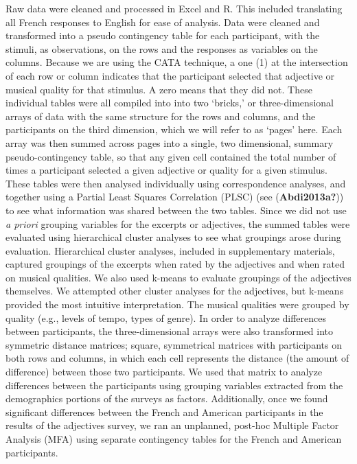 \documentclass[
  english,
  man,floatsintext]{apa6}
\begin{document}
Raw data were cleaned and processed in Excel and R. This included translating all French responses to English for ease of analysis. Data were cleaned and transformed into a pseudo contingency table for each participant, with the stimuli, as observations, on the rows and the responses as variables on the columns. Because we are using the CATA technique, a one (1) at the intersection of each row or column indicates that the participant selected that adjective or musical quality for that stimulus. A zero means that they did not. These individual tables were all compiled into into two `bricks,' or three-dimensional arrays of data with the same structure for the rows and columns, and the participants on the third dimension, which we will refer to as `pages' here. Each array was then summed across pages into a single, two dimensional, summary pseudo-contingency table, so that any given cell contained the total number of times a participant selected a given adjective or quality for a given stimulus. These tables were then analysed individually using correspondence analyses, and together using a Partial Least Squares Correlation (PLSC) (see (\textbf{Abdi2013a?})) to see what information was shared between the two tables.
Since we did not use \emph{a priori} grouping variables for the excerpts or adjectives, the summed tables were evaluated using hierarchical cluster analyses to see what groupings arose during evaluation. Hierarchical cluster analyses, included in supplementary materials, captured groupings of the excerpts when rated by the adjectives and when rated on musical qualities. We also used k-means to evaluate groupings of the adjectives themselves. We attempted other cluster analyses for the adjectives, but k-means provided the most intuitive interpretation. The musical qualities were grouped by quality (e.g., levels of tempo, types of genre).
In order to analyze differences between participants, the three-dimensional arrays were also transformed into symmetric distance matrices; square, symmetrical matrices with participants on both rows and columns, in which each cell represents the distance (the amount of difference) between those two participants. We used that matrix to analyze differences between the participants using grouping variables extracted from the demographics portions of the surveys as factors. Additionally, once we found significant differences between the French and American participants in the results of the adjectives survey, we ran an unplanned, post-hoc Multiple Factor Analysis (MFA) using separate contingency tables for the French and American participants.
\end{document}
